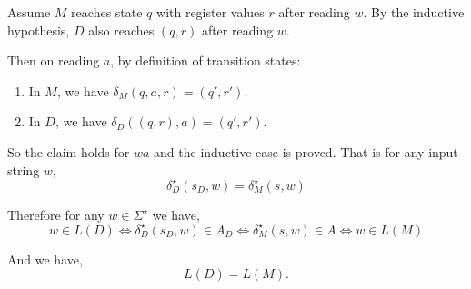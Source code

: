 \documentclass[12pt]{article}
\begin{document}
\begin{solution}
    Assume $M$ reaches state $q$ with register values $r$ after reading $w$. By the inductive hypothesis, $D$ also reaches $(q, r)$ after reading $w$.
    
    Then on reading $a$, by definition of transition states:
    \begin{enumerate}
        \item In $M$, we have $\delta_M(q, a, r) = (q',r')$. 
        \item In $D$, we have $\delta_D((q, r), a) = (q', r')$.
    \end{enumerate}

    So the claim holds for $wa$ and the inductive case is proved. That is for any input string $w$, 
    \[\delta^\star_D(s_D, w) = \delta^\star_M(s,w)\]

    Therefore for any $w \in \Sigma^\star$ we have, 
    \[w \in L(D) \iff \delta^\star_D(s_D, w) \in A_D \iff \delta_M^\star (s, w) \in A \iff w \in L(M)\]
  
    
    
    
    And we have,
    \[
    L(D) = L(M).
    \]

\end{solution}

\newpage 
\end{document}
